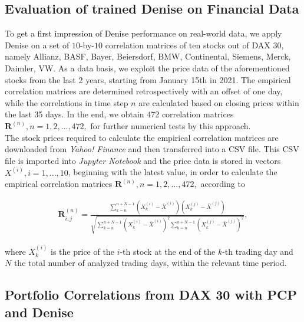 \subsection{Evaluation of trained Denise on Financial Data}
To get a first impression of Denise performance on real-world data, we apply Denise on a set of $10$-by-$10$ correlation matrices of ten stocks out of DAX 30, namely Allianz, BASF, Bayer, Beiersdorf, BMW, Continental, Siemens, Merck, Daimler, VW. As a data basis, we exploit the price data of the aforementioned stocks from the last 2 years, starting from January 15th in 2021. The empirical correlation matrices are determined retrospectively with an offset of one day, while the correlations in time step $n$ are calculated based on closing prices within the last 35 days. In the end, we obtain 472 correlation matrices $\mathbf{R}^{(n)}, n = 1, 2, ... , 472, $ for further numerical tests by this approach.\\

The stock prices required to calculate the empirical correlation matrices are downloaded from \textit{Yahoo! Finance} and then transferred into a CSV file. This CSV file is imported into \textit{Jupyter Notebook} and the price data is stored in vectors $X^{(i)}, i = 1, ... , 10$, beginning with the latest value, in order to calculate the empirical correlation matrices $\mathbf{R}^{(n)}, n = 1, 2, ... , 472, $ according to 

\begin{align}
\mathbf{R}_{i,j}^{(n)} = \frac{\sum_{k=n}^{n+N-1} (X_{k}^{(i)} - \bar{X}^{(i)}) (X_{k}^{(j)} - \bar{X}^{(j)})}{\sqrt{\sum_{k=n}^{n+N-1} (X_{k}^{(i)} - \bar{X}^{(i)})^{2} \sum_{k=n}^{n+N-1}(X_{k}^{(j)} - \bar{X}^{(j)})^{2}}},
\end{align}

where $X_{k}^{(i)}$ is the price of the $i$-th stock at the end of the $k$-th trading day and $N$ the total number of analyzed trading days, within the relevant time period.

\subsection{Portfolio Correlations from DAX 30 with PCP and Denise}


